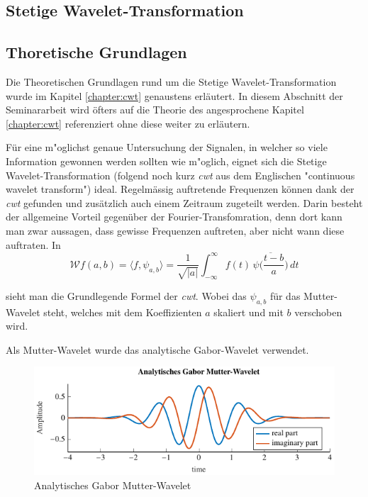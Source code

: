 \begin{refsection}
\newpage
\section{Stetige Wavelet-Transformation}
\subsection{Thoretische Grundlagen}
Die Theoretischen Grundlagen rund um die Stetige Wavelet-Transformation wurde im Kapitel \ref{chapter:cwt} genaustens erläutert. 
In diesem Abschnitt der Seminararbeit wird öfters auf die Theorie des angesprochene Kapitel \ref{chapter:cwt} referenziert ohne diese weiter zu erläutern. 

Für eine m"oglichst genaue Untersuchung der Signalen, in welcher so viele Information gewonnen werden sollten wie m"oglich, eignet sich die Stetige Wavelet-Transformation (folgend noch kurz \textit{cwt} aus dem Englischen "continuous wavelet transform")
ideal. 
Regelmässig auftretende Frequenzen können dank der \textit{cwt} gefunden und zusätzlich auch einem Zeitraum zugeteilt werden.
Darin besteht der allgemeine Vorteil gegenüber der Fourier-Transfomration, denn dort kann man zwar aussagen, dass gewisse Frequenzen auftreten, aber nicht wann diese auftraten.
In 
\begin{equation}
\mathcal{W}f (a,b)
=
\langle f,\psi_{a,b}\rangle
=
\frac{1}{\sqrt{|a|}}\int_{-\infty}^\infty f(t)\,\overline{
	\psi\biggl(\frac{t-b}{a}\biggr)}\,dt
\label{eq:cwt}
\end{equation}

sieht man die Grundlegende Formel der \textit{cwt}. Wobei das $\psi_{a,b}$ für das Mutter-Wavelet steht, welches mit dem Koeffizienten $a$ skaliert und mit $b$ verschoben wird.

Als Mutter-Wavelet wurde das analytische Gabor-Wavelet verwendet.
\begin{figure}[h]
\centering
\includegraphics[width=1\textwidth]{papers/wwt/images/gabor.pdf}
\caption{Analytisches Gabor Mutter-Wavelet}
\label{fig:gabor_plot}
\end{figure}


\end{refsection}
